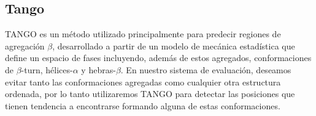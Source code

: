 % 
% 
% 
% 
% 




























\subsection{Tango}\label{tango}


TANGO\cite{fernandez2004prediction} es un método utilizado principalmente para predecir regiones de agregación $\beta$, desarrollado a partir de un modelo de mecánica estadística que define 
un espacio de fases incluyendo, además de estos agregados, conformaciones de $\beta$-turn, hélices-$\alpha$ y hebras-$\beta$.
En nuestro sistema de evaluación, deseamos evitar tanto las conformaciones agregadas como cualquier otra estructura ordenada, por lo tanto utilizaremos TANGO para detectar las posiciones que tienen tendencia a encontrarse formando
alguna de estas conformaciones.

